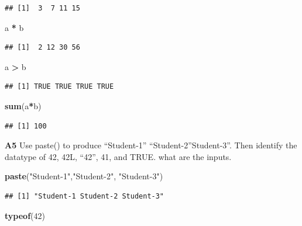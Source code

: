\documentclass[
]{article}
\newenvironment{Shaded}{\begin{snugshade}}{\end{snugshade}}
\newcommand{\DecValTok}[1]{\textcolor[rgb]{0.00,0.00,0.81}{#1}}
\newcommand{\FunctionTok}[1]{\textcolor[rgb]{0.13,0.29,0.53}{\textbf{#1}}}
\newcommand{\NormalTok}[1]{#1}
\newcommand{\SpecialCharTok}[1]{\textcolor[rgb]{0.81,0.36,0.00}{\textbf{#1}}}
\newcommand{\StringTok}[1]{\textcolor[rgb]{0.31,0.60,0.02}{#1}}
\begin{document}
\begin{verbatim}
## [1]  3  7 11 15
\end{verbatim}

\begin{Shaded}
\begin{Highlighting}[]
\NormalTok{a }\SpecialCharTok{*}\NormalTok{ b}
\end{Highlighting}
\end{Shaded}

\begin{verbatim}
## [1]  2 12 30 56
\end{verbatim}

\begin{Shaded}
\begin{Highlighting}[]
\NormalTok{a }\SpecialCharTok{\textgreater{}}\NormalTok{ b}
\end{Highlighting}
\end{Shaded}

\begin{verbatim}
## [1] TRUE TRUE TRUE TRUE
\end{verbatim}

\begin{Shaded}
\begin{Highlighting}[]
\FunctionTok{sum}\NormalTok{(a}\SpecialCharTok{*}\NormalTok{b)}
\end{Highlighting}
\end{Shaded}

\begin{verbatim}
## [1] 100
\end{verbatim}

\textbf{A5} Use paste() to produce ``Student-1''
``Student-2''Student-3''. Then identify the datatype of 42, 42L, ``42'',
41, and TRUE. what are the inputs.

\begin{Shaded}
\begin{Highlighting}[]
\FunctionTok{paste}\NormalTok{(}\StringTok{"Student{-}1"}\NormalTok{,}\StringTok{"Student{-}2"}\NormalTok{, }\StringTok{"Student{-}3"}\NormalTok{)}
\end{Highlighting}
\end{Shaded}

\begin{verbatim}
## [1] "Student-1 Student-2 Student-3"
\end{verbatim}

\begin{Shaded}
\begin{Highlighting}[]
\FunctionTok{typeof}\NormalTok{(}\DecValTok{42}\NormalTok{)}
\end{Highlighting}
\end{Shaded}
\end{document}
